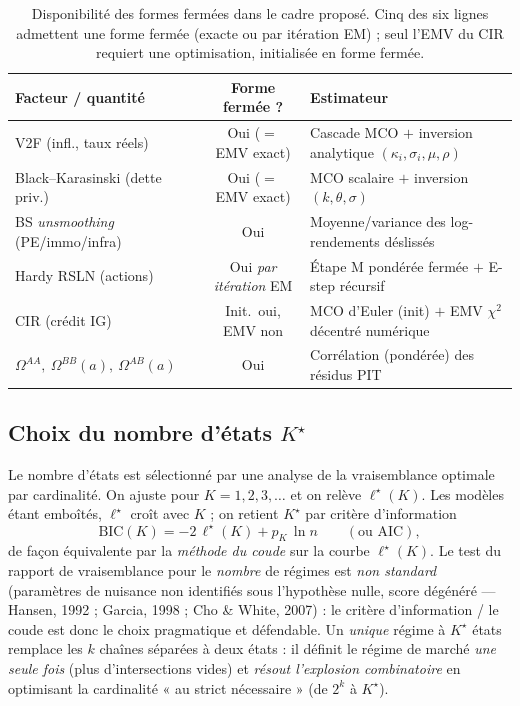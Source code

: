 \documentclass[11pt,a4paper]{article}
\theoremstyle{definition}
\begin{document}
\begin{table}[h]
\centering\small
\renewcommand{\arraystretch}{1.3}
\begin{tabularx}{\textwidth}{@{}l c X@{}}
\toprule
\textbf{Facteur / quantité} & \textbf{Forme fermée ?} & \textbf{Estimateur} \\
\midrule
V2F (infl., taux réels) & Oui ($=$ EMV exact) & Cascade MCO $+$ inversion analytique $(\kappa_i,\sigma_i,\mu,\rho)$ \\
Black--Karasinski (dette priv.) & Oui ($=$ EMV exact) & MCO scalaire $+$ inversion $(k,\theta,\sigma)$ \\
BS \emph{unsmoothing} (PE/immo/infra) & Oui & Moyenne/variance des log-rendements déslissés \\
Hardy RSLN (actions) & Oui \emph{par itération} EM & Étape M pondérée fermée $+$ E-step récursif \\
CIR (crédit IG) & Init.\ oui, EMV non & MCO d'Euler (init) $+$ EMV $\chi^2$ décentré numérique \\
$\Omega^{AA},\ \Omega^{BB}(a),\ \Omega^{AB}(a)$ & Oui & Corrélation (pondérée) des résidus PIT \\
\bottomrule
\end{tabularx}
\caption{Disponibilité des formes fermées dans le cadre proposé. Cinq des six lignes admettent une forme fermée (exacte ou par itération EM) ; seul l'EMV du CIR requiert une optimisation, initialisée en forme fermée.}
\label{tab:closed}
\end{table}

\subsection{Choix du nombre d'états $K^\star$}
\label{sec:K}

Le nombre d'états est sélectionné par une analyse de la vraisemblance optimale par cardinalité. On ajuste pour $K=1,2,3,\dots$ et on relève $\ell^\star(K)$. Les modèles étant emboîtés, $\ell^\star$ croît avec $K$ ; on retient $K^\star$ par critère d'information
\[
\mathrm{BIC}(K)=-2\,\ell^\star(K)+p_K\,\ln n\qquad(\text{ou AIC}),
\]
de façon équivalente par la \emph{méthode du coude} sur la courbe $\ell^\star(K)$. Le test du rapport de vraisemblance pour le \emph{nombre} de régimes est \emph{non standard} (paramètres de nuisance non identifiés sous l'hypothèse nulle, score dégénéré --- Hansen, 1992 ; Garcia, 1998 ; Cho \& White, 2007) : le critère d'information / le coude est donc le choix pragmatique et défendable. Un \emph{unique} régime à $K^\star$ états remplace les $k$ chaînes séparées à deux états : il définit le régime de marché \emph{une seule fois} (plus d'intersections vides) et \emph{résout l'explosion combinatoire} en optimisant la cardinalité « au strict nécessaire » (de $2^k$ à $K^\star$).
\end{document}
